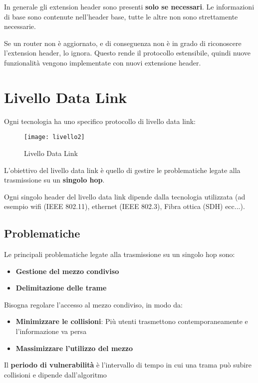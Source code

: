 \documentclass[a4paper]{article}
\begin{document}
\noindent
In generale gli extension header sono presenti \textbf{solo se necessari}. Le informazioni
di base sono contenute nell'header base, tutte le altre non sono strettamente necessarie.

Se un router non è aggiornato, e di conseguenza non è in grado di riconoscere l'extension
header, lo ignora. Questo rende il protocollo estensibile, quindi nuove funzionalità
vengono implementate con nuovi extensione header.

\section{Livello Data Link}
Ogni tecnologia ha uno specifico protocollo di livello data link:
\begin{figure}[H]
  \centering
  \texttt{[image: livello2]}
  \caption{Livello Data Link}
\end{figure}
\noindent
L'obiettivo del livello data link è quello di gestire le problematiche legate alla
trasmissione su un \textbf{singolo hop}.

Ogni singolo header del livello data link dipende dalla tecnologia utilizzata (ad esempio
wifi (IEEE 802.11), ethernet (IEEE 802.3), Fibra ottica (SDH) ecc...).

\subsection{Problematiche}
Le principali problematiche legate alla trasmissione su un singolo hop sono:
\begin{itemize}
  \item \textbf{Gestione del mezzo condiviso}
  \item \textbf{Delimitazione delle trame}
\end{itemize}
Bisogna regolare l'accesso al mezzo condiviso, in modo da:
\begin{itemize}
  \item \textbf{Minimizzare le collisioni}: Più utenti trasmettono contemporaneamente e 
    l'informazione va persa
  \item \textbf{Massimizzare l'utilizzo del mezzo}
\end{itemize}

\vspace{1em}
\noindent
Il \textbf{periodo di vulnerabilità} è l'intervallo di tempo in cui una trama può subire
collisioni e dipende dall'algoritmo
\end{document}
